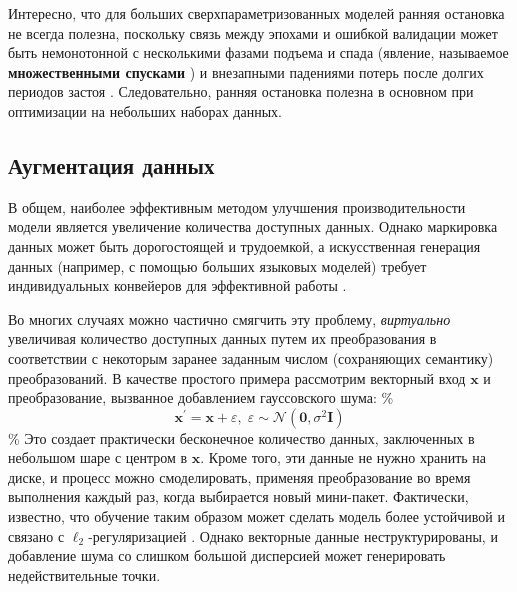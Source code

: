 Интересно, что для больших сверхпараметризованных моделей ранняя остановка не всегда полезна, поскольку связь между эпохами и ошибкой валидации может быть немонотонной с несколькими фазами подъема и спада (явление, называемое \textbf{множественными спусками} \cite{rocks2022memorizing}) и внезапными падениями потерь после долгих периодов застоя \cite{power2022grokking}. Следовательно, ранняя остановка полезна в основном при оптимизации на небольших наборах данных.

\subsection{Аугментация данных} \addclock

В общем, наиболее эффективным методом улучшения производительности модели является увеличение количества доступных данных. Однако маркировка данных может быть дорогостоящей и трудоемкой, а искусственная генерация данных (например, с помощью больших языковых моделей) требует индивидуальных конвейеров для эффективной работы \cite{patel2024datadreamer}.

Во многих случаях можно частично смягчить эту проблему, \textit{виртуально} увеличивая количество доступных данных путем их преобразования в соответствии с некоторым заранее заданным числом (сохраняющих семантику) преобразований. В качестве простого примера рассмотрим векторный вход $\mathbf{x}$ и преобразование, вызванное добавлением гауссовского шума:
\%
$$
\mathbf{x}^\prime=\mathbf{x}+\varepsilon,\;\varepsilon \sim \mathcal{N}(\mathbf{0},\sigma^2\mathbf{I})
$$
\%
Это создает практически бесконечное количество данных, заключенных в небольшом шаре с центром в $\mathbf{x}$. Кроме того, эти данные не нужно хранить на диске, и процесс можно смоделировать, применяя преобразование во время выполнения каждый раз, когда выбирается новый мини-пакет. Фактически, известно, что обучение таким образом может сделать модель более устойчивой и связано с $\ell_2$-регуляризацией \cite{bishop1995training}. Однако векторные данные неструктурированы, и добавление шума со слишком большой дисперсией может генерировать недействительные точки.

